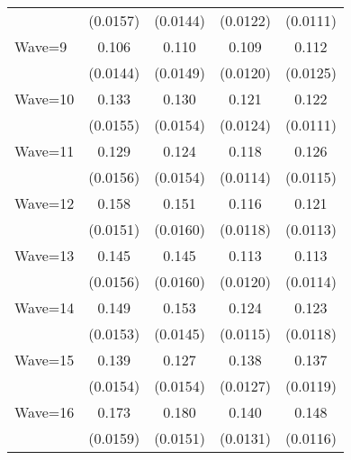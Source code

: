 {\begin{tabular}{l*{4}{c}}
                    &    (0.0157)         &    (0.0144)         &    (0.0122)         &    (0.0111)         \\
[1em]
Wave=9              &       0.106\sym{***}&       0.110\sym{***}&       0.109\sym{***}&       0.112\sym{***}\\
                    &    (0.0144)         &    (0.0149)         &    (0.0120)         &    (0.0125)         \\
[1em]
Wave=10             &       0.133\sym{***}&       0.130\sym{***}&       0.121\sym{***}&       0.122\sym{***}\\
                    &    (0.0155)         &    (0.0154)         &    (0.0124)         &    (0.0111)         \\
[1em]
Wave=11             &       0.129\sym{***}&       0.124\sym{***}&       0.118\sym{***}&       0.126\sym{***}\\
                    &    (0.0156)         &    (0.0154)         &    (0.0114)         &    (0.0115)         \\
[1em]
Wave=12             &       0.158\sym{***}&       0.151\sym{***}&       0.116\sym{***}&       0.121\sym{***}\\
                    &    (0.0151)         &    (0.0160)         &    (0.0118)         &    (0.0113)         \\
[1em]
Wave=13             &       0.145\sym{***}&       0.145\sym{***}&       0.113\sym{***}&       0.113\sym{***}\\
                    &    (0.0156)         &    (0.0160)         &    (0.0120)         &    (0.0114)         \\
[1em]
Wave=14             &       0.149\sym{***}&       0.153\sym{***}&       0.124\sym{***}&       0.123\sym{***}\\
                    &    (0.0153)         &    (0.0145)         &    (0.0115)         &    (0.0118)         \\
[1em]
Wave=15             &       0.139\sym{***}&       0.127\sym{***}&       0.138\sym{***}&       0.137\sym{***}\\
                    &    (0.0154)         &    (0.0154)         &    (0.0127)         &    (0.0119)         \\
[1em]
Wave=16             &       0.173\sym{***}&       0.180\sym{***}&       0.140\sym{***}&       0.148\sym{***}\\
                    &    (0.0159)         &    (0.0151)         &    (0.0131)         &    (0.0116)         \\

\end{tabular}}

